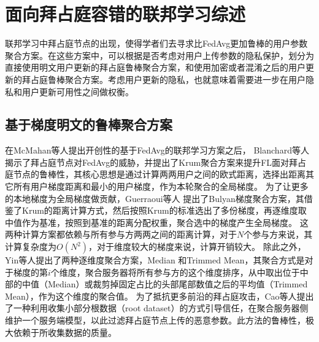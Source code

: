 \section{面向拜占庭容错的联邦学习综述}
\label{sec:byzantine}
联邦学习中拜占庭节点的出现，使得学者们去寻求比FedAvg更加鲁棒的用户参数聚合方案\cite{blanchard2017machine, guerraoui2018hidden, yin2018byzantine, DBLP:conf/ndss/CaoF0G21, he2020secure, hashemi2021byzantine, khazbak2020mlguard, liu2021privacy, nguyen2022flame, hao2021efficient, dong2021flod}。在这些方案中，可以根据是否考虑对用户上传参数的隐私保护，划分为直接使用明文用户更新的拜占庭鲁棒聚合方案\cite{blanchard2017machine, guerraoui2018hidden, yin2018byzantine, DBLP:conf/ndss/CaoF0G21}，和使用加密或者混淆之后的用户更新的拜占庭鲁棒聚合方案\cite{he2020secure, hashemi2021byzantine, khazbak2020mlguard, liu2021privacy, nguyen2022flame, hao2021efficient, dong2021flod}。考虑用户更新的隐私，也就意味着需要进一步在用户隐私和用户更新可用性之间做权衡。

\subsection{基于梯度明文的鲁棒聚合方案}
在McMahan等人\cite{mcmahan2017communication}提出开创性的基于FedAvg的联邦学习方案之后，
Blanchard等人\cite{blanchard2017machine}揭示了拜占庭节点对FedAvg的威胁，并提出了Krum聚合方案来提升FL面对拜占庭节点的鲁棒性，其核心思想是通过计算两两用户之间的欧式距离，选择出距离其它所有用户梯度距离和最小的用户梯度，作为本轮聚合的全局梯度。
为了让更多的本地梯度为全局梯度做贡献，Guerraoui等人 \cite{guerraoui2018hidden}提出了Bulyan梯度聚合方案，其借鉴了Krum的距离计算方式，然后按照Krum的标准选出了多份梯度，再逐维度取中值作为基准，按照到基准的距离分配权重，聚合选中的梯度产生全局梯度。
这两种计算方案都依赖与所有参与方两两之间的距离计算，对于$N$个参与方来说，其计算复杂度为$O(N^2)$，对于维度较大的梯度来说，计算开销较大。
除此之外，Yin等人\cite{yin2018byzantine}提出了两种逐维度聚合方案，Median 和Trimmed Mean，其聚合方式是对于梯度的第$i$个维度，聚合服务器将所有参与方的这个维度排序，从中取出位于中部的中值（Median）或裁剪掉固定占比的头部尾部数值之后的平均值（Trimmed Mean），作为这个维度的聚合值。
为了抵抗更多前沿的拜占庭攻击，Cao等人\cite{DBLP:conf/ndss/CaoF0G21}提出了一种利用收集小部分根数据（root dataset）的方式引导信任，在聚合服务器侧维护一个服务端模型，以此过滤拜占庭节点上传的恶意参数。此方法的鲁棒性，极大依赖于所收集数据的质量。

